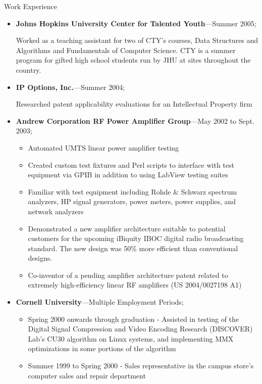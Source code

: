 \documentclass[10pt,oneside]{article}
\newenvironment{ressection}[1]{
	\vspace{4pt}
	{\Large#1}
	\begin{itemize}
	\vspace{3pt}
}{
	\end{itemize}
}
\newcommand{\ressubitem}[1]{
	\vspace{-1pt}
	\item \begin{flushleft} #1 \end{flushleft}
}
\newcommand{\resbigitem}[3]{
	\vspace{-5pt}
	\item
	\textbf{#1}---#2; \quad \textit{#3}
}
\newenvironment{ressubsec}[3]{
	\resbigitem{#1}{#2}{#3}
	\vspace{-2pt}
	\begin{itemize}
}{
	\end{itemize}
}
\newenvironment{ressection}[1]{
	\vspace{4pt}
	{\fontfamily{phv}\selectfont\Large#1}
	\begin{itemize}
	\vspace{3pt}
}{
	\end{itemize}
}
\newcommand{\ressubitem}[1]{
	\vspace{-1pt}
	\item \begin{flushleft} #1 \end{flushleft}
}
\newcommand{\resbigitem}[2]{
	\vspace{-5pt}
	\item
	\textbf{#1}---\textit{#2}
}
\newenvironment{ressubsec}[2]{
	\resbigitem{#1}{#2}
	\vspace{-2pt}
	\begin{itemize}
}{
	\end{itemize}
}
\begin{document}
\begin{ressection}{Work Experience}
	\begin{ressubsec}{Johns Hopkins University Center for Talented Youth}{Summer 2005}
		\ressubitem{Worked as a teaching assistant for two of CTY's courses, Data Structures and Algorithms and Fundamentals of Computer Science.  CTY is a summer program for gifted high school students run by JHU at sites throughout the country.}
	\end{ressubsec}

	\begin{ressubsec}{IP Options, Inc.}{Summer 2004}
		\ressubitem{Researched patent applicability evaluations for an Intellectual Property firm}
	\end{ressubsec}

	\begin{ressubsec}{Andrew Corporation RF Power Amplifier Group}{May 2002 to Sept. 2003}
		\ressubitem{Developed new amplifier architectures}
	        \ressubitem{Automated UMTS linear power amplifier testing}
		\ressubitem{Created custom test fixtures and Perl scripts to interface with test equipment via GPIB in addition to using LabView testing suites}
		\ressubitem{Familiar with test equipment including Rohde \& Schwarz spectrum analyzers, HP signal generators, power meters, power supplies, and network analyzers}
		\ressubitem{Demonstrated a new amplifier architecture suitable to potential customers for the upcoming iBiquity IBOC digital radio broadcasting standard. The new design was 50\% more efficient than conventional designs.}
		\ressubitem{Co-inventor of a pending amplifier architecture patent related to extremely high-efficiency linear RF amplifiers (US 2004/0027198 A1)}
	\end{ressubsec}

	\begin{ressubsec}{Cornell University}{Multiple Employment Periods}
	  \ressubitem{Summer 2001 - Assisted in the design of a digital receiver for Cornell University's CUPRI radar system using the Analog Devices AD6620 digital downconverter device and a National Instruments PCI-DIO-32HS digital I/O card}
	  \ressubitem{Spring 2000 onwards through graduation - Assisted in testing of the Digital Signal Compression and Video Encoding Research (DISCOVER) Lab's CU30 algorithm on Linux systems, and implementing MMX optimizations in some portions of the algorithm}
          \ressubitem{Summer 1999 to Spring 2000 - Sales representative in the campus store's computer sales and repair department}
	\end{ressubsec}


\end{ressection}
\end{document}
